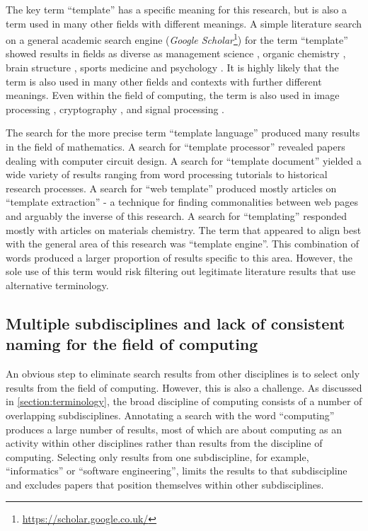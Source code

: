 The key term \enquote{template} has a specific meaning for this research, but is also a term used in many other fields with different meanings. A simple literature search on a general academic search engine (\emph{Google Scholar}\footnote{\url{https://scholar.google.co.uk/}}) for the term \enquote{template} showed results in fields as diverse as management science \citep{Jensen2007}, organic chemistry \citep{Hu2019}, brain structure \citep{Brett2001}, sports medicine \citep{Foster2009} and psychology \citep{King1998}. It is highly likely that the term is also used in many other fields and contexts with further different meanings. Even within the field of computing, the term is also used in image processing \citep{Matthews2004}, cryptography \citep{Chari2003}, and signal processing \citep{Jain1998}.

The search for the more precise term \enquote{template language} produced many results in the field of mathematics. A search for \enquote{template processor} revealed papers dealing with computer circuit design. A search for \enquote{template document} yielded a wide variety of results ranging from word processing tutorials to historical research processes. A search for \enquote{web template} produced mostly articles on \enquote{template extraction} - a technique for finding commonalities between web pages and arguably the inverse of this research. A search for \enquote{templating} responded mostly with articles on materials chemistry. The term that appeared to align best with the general area of this research was \enquote{template engine}. This combination of words produced a larger proportion of results specific to this area. However, the sole use of this term would risk filtering out legitimate literature results that use alternative terminology.

\subsection{Multiple subdisciplines and lack of consistent naming for the field of computing}
\label{literature:subdisciplines}

An obvious step to eliminate search results from other disciplines is to select only results from the field of computing. However, this is also a challenge. As discussed in \autoref{section:terminology}, the broad discipline of computing consists of a number of overlapping subdisciplines. Annotating a search with the word \enquote{computing} produces a large number of results, most of which are about computing as an activity within other disciplines rather than results from the discipline of computing. Selecting only results from one subdiscipline, for example, \enquote{informatics} or \enquote{software engineering}, limits the results to that subdiscipline and excludes papers that position themselves within other subdisciplines.


